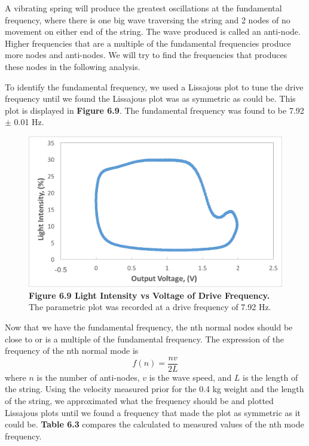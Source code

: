 \documentclass[11pt]{report}
\begin{document}
A vibrating spring will produce the greatest oscillations at the fundamental
frequency, where there is one big wave traversing the string and 2 nodes of no
movement on either end of the string.  The wave produced is called an anti-node.
Higher frequencies that are a multiple of the fundamental frequencies produce
more nodes and anti-nodes.  We will try to find the frequencies that produces
these nodes in the following analysis.

To identify the fundamental frequency, we used a Lissajous plot to tune the
drive frequency until we found the Lissajous plot was as symmetric as could be.
This plot is displayed in \textbf{Figure 6.9}.  The fundamental frequency was
found to be 7.92 $\pm$ 0.01 Hz.

\begin{figure}
    \includegraphics[width=\linewidth]{DriveFrequency.png}
    \captionsetup{labelformat=empty}
    \caption{\textbf{Figure 6.9 Light Intensity vs Voltage of Drive Frequency.}
    The parametric plot was recorded at a drive frequency of 7.92 Hz.}
\end{figure}

Now that we have the fundamental frequency, the nth normal nodes should be close
to or is a multiple of the fundamental frequency.  
The expression of the frequency of the nth normal mode is \[f(n) =
\frac{nv}{2L}\] where $n$ is the number of anti-nodes, $v$ is the wave speed,
and $L$ is the length of the string. Using the velocity measured prior for the
0.4 kg weight and the
length of the string, we approximated what the frequency should be and plotted
Lissajous plots until we found a frequency that made the plot as symmetric as it
could be.  \textbf{Table 6.3} compares the calculated to measured values of the
nth mode frequency.
\end{document}
